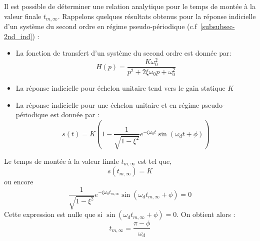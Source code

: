Il est possible de déterminer une relation analytique pour le temps
de montée à la valeur finale $t_{m,\infty}$. Rappelons quelques résultats obtenus
pour la réponse indicielle d'un système du second ordre en régime 
pseudo-périodique (c.f~\cref{subsubsec-2nd_ind}) :
\begin{itemize}
\item La fonction de transfert d'un système du second ordre est donnée
par:
$$
H(p)=\dfrac{K\omega_0^2}{p^2+2\xi\omega_0p+\omega_0^2}
$$
\item La réponse indicielle pour échelon unitaire tend vers le gain statique $K$ 
\item La réponse indicielle pour une échelon unitaire et en régime 
      pseudo-périodique est donnée par : 
$$
    s(t) = K \left( 1 - 
           \dfrac{1}{\sqrt{1-\xi^2}} 
           e^{-\xi\omega_0 t}
           \sin{(\omega_d t+\phi)}\right)\label{eq-2-3_2nd} 
$$
\end{itemize}
Le temps de montée à la valeur finale $t_{m,\infty}$ est tel que, 
$$
s(t_{m,\infty})=K
$$
ou encore  
$$
\dfrac{1}{\sqrt{1-\xi^2}}e^{-\xi\omega_0 t_{m,\infty}}\sin{(\omega_d t_{m,\infty}+\phi)}=0
$$
Cette expression est nulle que si $\sin{(\omega_d t_{m,\infty}+\phi)}=0$.
On obtient alors :
$$
t_{m,\infty}=\dfrac{\pi-\phi}{\omega_d}
$$

